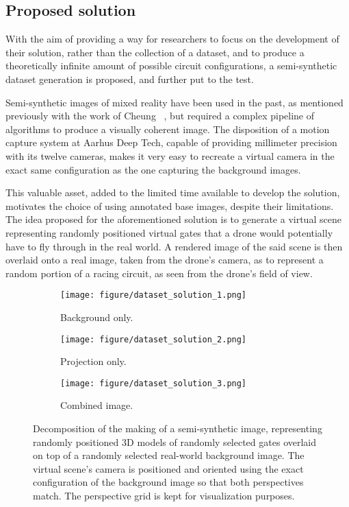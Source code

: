 \subsection{Proposed solution}

With the aim of providing a way for researchers to focus on the development of
their solution, rather than the collection of a dataset, and to produce a
theoretically infinite amount of possible circuit configurations, a
semi-synthetic dataset generation is proposed, and further put to the test.

Semi-synthetic images of mixed reality have been used in the past, as mentioned
previously with the work of Cheung \etal~\cite{CheungWBM17}, but required a
complex pipeline of algorithms to produce a visually coherent image. The
disposition of a motion capture system at Aarhus Deep Tech, capable of
providing millimeter precision with its twelve cameras, makes it very easy to
recreate a virtual camera in the exact same configuration as the one capturing
the background images.

This valuable asset, added to the limited time available to develop the
solution, motivates the choice of using annotated base images, despite their
limitations.\\

The idea proposed for the aforementioned solution is to generate a virtual
scene representing randomly positioned virtual gates that a drone would
potentially have to fly through in the real world. A rendered image of the said
scene is then overlaid onto a real image, taken from the drone's camera, as to
represent a random portion of a racing circuit, as seen from the drone's field
of view. 

\begin{figure}[h]
	\centering
	\begin{subfigure}{0.32\textwidth}
		\texttt{[image: figure/dataset\_solution\_1.png]}
		\caption{Background only.}
	\end{subfigure}
	\begin{subfigure}{0.32\textwidth}
		\texttt{[image: figure/dataset\_solution\_2.png]}
		\caption{Projection only.}
	\end{subfigure}
	\begin{subfigure}{0.32\textwidth}
		\texttt{[image: figure/dataset\_solution\_3.png]}
		\caption{Combined image.}
	\end{subfigure}
	\caption[The steps of a semi-synthetic image generation.]{Decomposition
	of the making of a semi-synthetic image, representing randomly positioned
	3D models of randomly selected gates overlaid on top of a randomly selected
	real-world background image. The virtual scene's camera is positioned and
	oriented using the exact configuration of the background image so that
	both perspectives match. The perspective grid is kept for visualization
	purposes.}
\end{figure}

